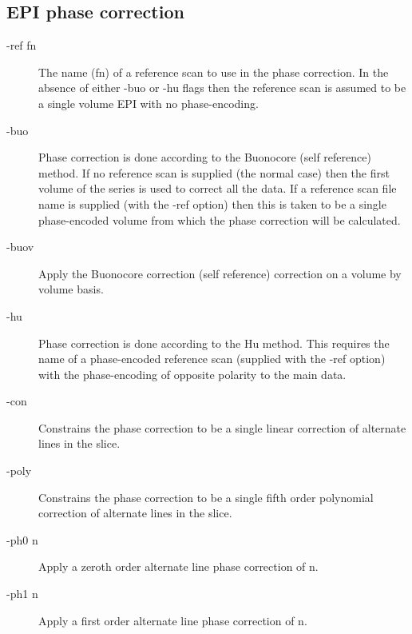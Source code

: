 \documentclass[12pt, a4paper]{article}
\begin{document}
\subsection*{EPI phase correction}
\begin{description}
\item[-ref fn] The name (fn) of a reference scan to use in the
  phase correction.  In the absence of either -buo or -hu flags then
  the reference scan is assumed to be a single volume EPI with no
  phase-encoding.
\item[-buo] Phase correction is done according to the Buonocore (self
  reference) method.  If no reference scan is supplied (the normal
  case) then the first volume of the series is used to correct all the
  data.  If a reference scan file name is supplied (with the -ref
  option) then this is taken to be a single phase-encoded volume from
  which the phase correction will be calculated.
\item[-buov] Apply the Buonocore correction (self reference)
  correction on a volume by volume basis.
\item[-hu] Phase correction is done according to the Hu method.  This
  requires the name of a phase-encoded reference scan (supplied with
  the -ref option) with the phase-encoding of opposite polarity to the
  main data.
\item[-con] Constrains the phase correction to be a single linear
  correction of alternate lines in the slice.
\item[-poly] Constrains the phase correction to be a single fifth
  order polynomial correction of alternate lines in the slice.
\item[-ph0 n] Apply a zeroth order alternate line phase correction of
  n.
\item[-ph1 n] Apply a first order alternate line phase correction of
  n.  
\end{description}
\end{document}

